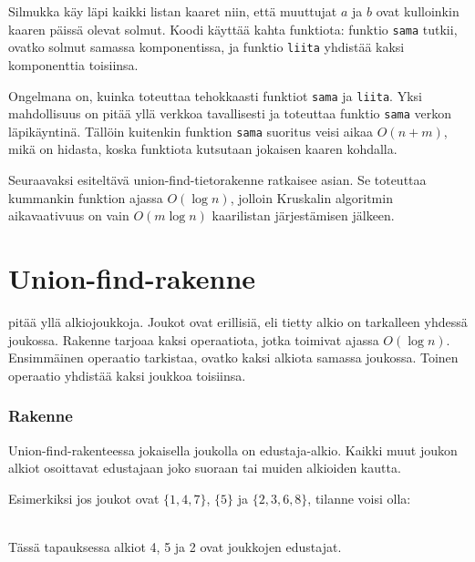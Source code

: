 Silmukka käy läpi kaikki listan kaaret
niin, että muuttujat $a$ ja $b$ ovat kulloinkin kaaren
päissä olevat solmut.
Koodi käyttää kahta funktiota:
funktio \texttt{sama} tutkii,
ovatko solmut samassa komponentissa,
ja funktio \texttt{liita}
yhdistää kaksi komponenttia toisiinsa.

Ongelmana on, kuinka toteuttaa tehokkaasti
funktiot \texttt{sama} ja \texttt{liita}.
Yksi mahdollisuus on pitää yllä verkkoa tavallisesti
ja toteuttaa funktio \texttt{sama} verkon läpikäyntinä.
Tällöin kuitenkin funktion \texttt{sama}
suoritus veisi aikaa $O(n+m)$,
mikä on hidasta, koska funktiota kutsutaan
jokaisen kaaren kohdalla.

Seuraavaksi esiteltävä union-find-tietorakenne
ratkaisee asian.
Se toteuttaa kummankin funktion
ajassa $O(\log n)$,
jolloin Kruskalin algoritmin
aikavaativuus on vain $O(m \log n)$
kaarilistan järjestämisen jälkeen.

\section{Union-find-rakenne}


 pitää yllä
alkiojoukkoja.
Joukot ovat erillisiä,
eli tietty alkio on tarkalleen
yhdessä joukossa.
Rakenne tarjoaa kaksi operaatiota,
jotka toimivat ajassa $O(\log n)$.
Ensimmäinen operaatio tarkistaa,
ovatko kaksi alkiota samassa joukossa.
Toinen operaatio yhdistää kaksi
joukkoa toisiinsa.

\subsubsection{Rakenne}

Union-find-rakenteessa jokaisella
joukolla on edustaja-alkio.
Kaikki muut joukon alkiot osoittavat
edustajaan joko suoraan tai
muiden alkioiden kautta.

Esimerkiksi jos joukot ovat
$\{1,4,7\}$, $\{5\}$ ja $\{2,3,6,8\}$,
tilanne voisi olla:
\\
\begin{center}
\end{center}
~\\
Tässä tapauksessa alkiot 4, 5 ja 2
ovat joukkojen edustajat.

